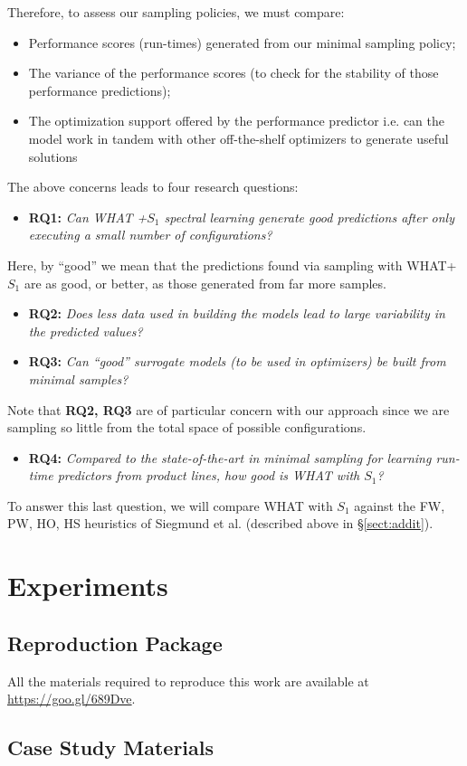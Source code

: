 \documentclass{sig-alternative}
\newcommand{\bi}{\begin{itemize}}%
\newcommand{\ei}{\end{itemize}}
\newcommand{\tion}[1]{\S\ref{sect:#1}}
\begin{document}
Therefore, to assess our sampling policies, we must compare:
\bi
\item Performance scores (run-times) generated from our minimal sampling policy;
\item The variance of the performance scores (to check for the stability
of those performance predictions);
\item The optimization support offered by the performance predictor i.e. can the model work in tandem with other off-the-shelf optimizers to generate useful solutions
\ei
The above concerns leads to four research questions:
\bi
\item {\bf RQ1:} {\em Can  WHAT  +$S_1$ spectral learning generate good predictions after only
executing a small number of configurations?}
\ei
Here, by ``good'' we mean that the predictions found via sampling with WHAT+$S_1$ are as good, or better,
as those generated from far more samples.
\bi
\item {\bf RQ2:} {\em
Does less data used in building the models lead to large variability in the predicted values?}
\item {\bf RQ3:} {\em
Can ``good'' surrogate models (to be used in optimizers)
be built from minimal samples?}
\ei
Note that {\bf RQ2, RQ3} are of particular concern with our approach
since we are sampling so little from the total space of possible
configurations.
\bi
\item {\bf RQ4:} {\em Compared to the state-of-the-art in minimal sampling for
learning run-time predictors from product lines, how good is WHAT with $S_1$?}
\ei
To answer this last question, we will compare WHAT with $S_1$
          against the FW, PW, HO, HS heuristics of Siegmund et al. (described above in \tion{addit}).
 
\section{Experiments}

\subsection{Reproduction Package}

All the materials required to reproduce this work are available at \url{https://goo.gl/689Dve}.

\subsection{Case Study Materials}
\end{document}
